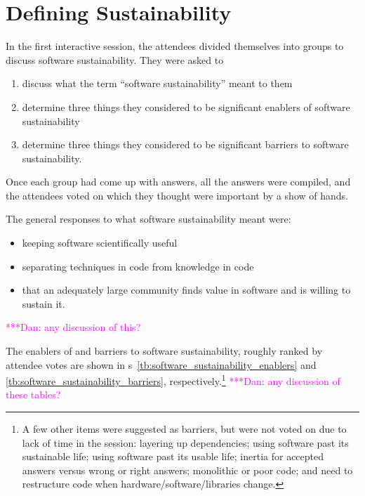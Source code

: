 \documentclass[11pt, oneside]{amsart}
\newcommand{\todo}[1]{{\color{blue}$\blacksquare$~\textsf{[TODO: #1]}}}
\newcommand{\katznote}[1]{ {\textcolor{magenta}    { ***Dan:      #1 }}}
\begin{document}
\smallskip

\section{Defining Sustainability} \label{sec:defining}


In the first interactive session, the attendees divided themselves into groups
to discuss software sustainability. They were asked to
\begin{enumerate}
\item discuss what the term ``software sustainability'' meant to them

\item determine three things they considered to be significant enablers of
software sustainability

\item determine three things they considered to be significant barriers to
software sustainability.
\end{enumerate}
Once each group had come up with answers, all the answers were compiled, and the
attendees voted on which they thought were important by a show of hands.

The general responses to what software sustainability meant were:
\begin{itemize}
\item keeping software scientifically useful
\item separating techniques in code from knowledge in code
\item that an adequately large community finds value in software and is willing
to sustain it.
\end{itemize}
\katznote{any discussion of this?}

The enablers of and barriers to software sustainability, roughly ranked by
attendee votes are shown in
{\tablename}s~\ref{tb:software_sustainability_enablers} and
\ref{tb:software_sustainability_barriers}, respectively.\footnote{A few other
items were suggested as barriers, but were not voted on due to lack of time in
the session:
layering up dependencies;
using software past its sustainable life;
using software past its usable life;
inertia for accepted answers versus wrong or right answers;
monolithic or poor code; and
need to restructure code when hardware/software/libraries change.
}
\katznote{any discussion of these tables?}
\end{document}
